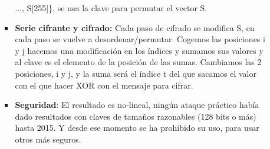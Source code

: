 \documentclass[12pt, twoside, openright]{report} %
\begin{document}
\begin{itemize}
\begin{itemize}
\begin{itemize}
			                  ..., S{[}255{]}\}, se usa la clave para permutar el vector S.
			            \item \textbf{Serie cifrante y cifrado:} Cada paso de cifrado se modifica S, en cada paso se vuelve a desordenar/permutar. Cogemos las posiciones i y j hacemos una modificación en los
			                  índices y sumamos sus valores y al clave es el elemento de la posición de las sumas. Cambiamos las 2 posiciones, i y j, y la suma será el índice t del que sacamos el valor con el que hacer XOR con el mensaje para cifrar.
			            \item \textbf{Seguridad}: El resultado es no-lineal, ningún ataque práctico había dado resultados con claves de tamaños razonables
			                  (128 bits o más) hasta 2015. Y desde ese momento se ha prohibido su uso, para usar otros más seguros.
		            \end{itemize}
	      \end{itemize}
\end{itemize}
\end{document}
